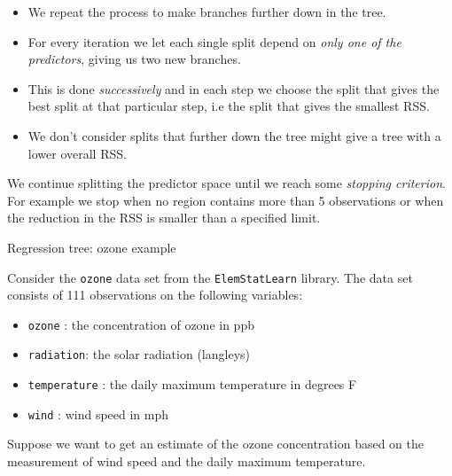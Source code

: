 \documentclass[ignorenonframetext,]{beamer}
\providecommand{\tightlist}{%
  \setlength{\itemsep}{0pt}\setlength{\parskip}{0pt}}
\begin{document}
\begin{frame}

\begin{itemize}
\tightlist
\item
  We repeat the process to make branches further down in the tree.
\item
  For every iteration we let each single split depend on \emph{only one
  of the predictors}, giving us two new branches.
\item
  This is done \emph{successively} and in each step we choose the split
  that gives the best split at that particular step, i.e the split that
  gives the smallest RSS.
\item
  We don't consider splits that further down the tree might give a tree
  with a lower overall RSS.
\end{itemize}

We continue splitting the predictor space until we reach some
\emph{stopping criterion}. For example we stop when no region contains
more than 5 observations or when the reduction in the RSS is smaller
than a specified limit.

\end{frame}

\begin{frame}[fragile]

\begin{block}{Regression tree: ozone example}

Consider the \texttt{ozone} data set from the \texttt{ElemStatLearn}
library. The data set consists of 111 observations on the following
variables:

\begin{itemize}
\tightlist
\item
  \texttt{ozone} : the concentration of ozone in ppb
\item
  \texttt{radiation}: the solar radiation (langleys)
\item
  \texttt{temperature} : the daily maximum temperature in degrees F
\item
  \texttt{wind} : wind speed in mph
\end{itemize}

Suppose we want to get an estimate of the ozone concentration based on
the measurement of wind speed and the daily maximum temperature.

\end{block}

\end{frame}
\end{document}
